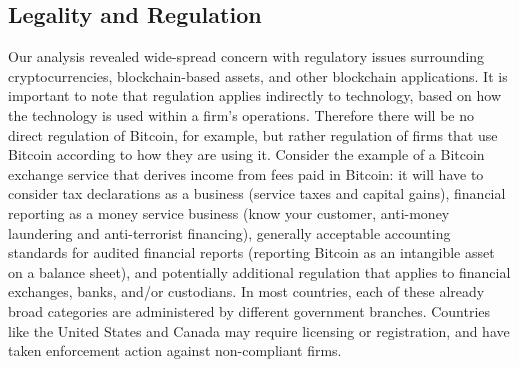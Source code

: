 %
%

\subsection{Legality and Regulation}

Our analysis revealed wide-spread concern with regulatory issues surrounding cryptocurrencies, blockchain-based assets, and other blockchain applications. It is important to note that regulation applies indirectly to technology, based on how the technology is used within a firm's operations. Therefore there will be no direct regulation of Bitcoin, for example, but rather regulation of firms that use Bitcoin according to how they are using it. Consider the example of a Bitcoin exchange service that derives income from fees paid in Bitcoin: it will have to consider tax declarations as a business (\eg service taxes and capital gains), financial reporting as a money service business (\eg know your customer, anti-money laundering and anti-terrorist financing), generally acceptable accounting standards for audited financial reports (\eg reporting Bitcoin as an intangible asset on a balance sheet), and potentially additional regulation that applies to financial exchanges, banks, and/or custodians. In most countries, each of these already broad categories are administered by different government branches. Countries like the United States and Canada may require licensing or registration, and have taken enforcement action against non-compliant firms.

